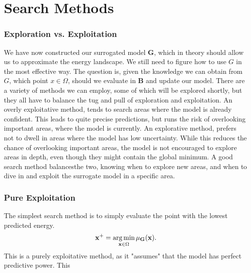 \documentclass[working, oneside]{../../../Preambles/marginclass}
\begin{document}
\chapter{Search Methods}

\subsection{Exploration vs. Exploitation}
We have now constructed our surrogated model $\bm{G}$, which in theory should allow us to approximate the energy landscape. We still need to figure how to use $G$ in the most effective way. The question is, given the knowledge we can obtain from $G$, which point $x \in \Omega$, should we evaluate in $\bm{B}$ and update our model. There are a variety of methods we can employ, some of which will be explored shortly, but they all have to balance the tug and pull of exploration and exploitation. An overly exploitative method, tends to search areas where the model is already confident. This leads to quite precise predictions, but runs the risk of overlooking important areas, where the model is currently. An explorative method, prefers not to dwell in areas where the model has low uncertainty. While this reduces the chance of overlooking important areas, the model is not encouraged to explore areas in depth, even though they might contain the global minimum. A good search method balancesthe two, knowing when to explore new areas, and when to dive in and exploit the surrogate model in a specific area. 
\subsection{Pure Exploitation}
The simplest search method is to simply evaluate the point with the lowest predicted energy.
\[
\mathbf{x}^{+} = \operatorname*{arg\,min}_{\mathbf{x} \in \Omega} \mu_{\mathbf{G}}(\mathbf{x})
.\] 
This is a purely exploitative method, as it "assumes" that the model has perfect predictive power. This 
\end{document}
